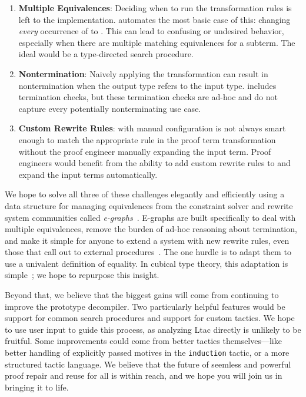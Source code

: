 \begin{enumerate}
\item \textbf{Multiple Equivalences}: Deciding when to run the transformation rules is left to the implementation.
\toolname automates the most basic case of this: changing \textit{every} occurrence of \A to \B.
This can lead to confusing or undesired behavior, especially when there are multiple matching equivalences for a subterm.
The ideal would be a type-directed search procedure.
\item \textbf{Nontermination}: Naively applying the transformation can result in nontermination when the output type refers to the input type.
\toolname includes termination checks, but these termination checks are ad-hoc and do not capture every potentially nonterminating use case.
\item \textbf{Custom Rewrite Rules}: \toolname with manual configuration is not always smart enough to match the appropriate rule in the proof term
transformation without the proof engineer manually expanding the input term.
Proof engineers would benefit from the ability to add custom rewrite rules to \toolname
and expand the input terms automatically.
\end{enumerate}
We hope to solve all three of these challenges elegantly and efficiently using a
data structure for managing equivalences from the constraint solver and rewrite system communities
called \textit{e-graphs}~\cite{egraph1}.
E-graphs are built specifically to deal with multiple equivalences,
remove the burden of ad-hoc reasoning about termination,
and make it simple for anyone to extend a system with new
rewrite rules, even those that call out
to external procedures~\cite{egraph5}.
The one hurdle is to adapt them to use a univalent definition of equality.
In cubical type theory, this adaptation is simple~\cite{egraph6}; we hope to repurpose this insight.

Beyond that, we believe that the biggest gains will come from continuing to improve the prototype decompiler.
Two particularly helpful features would be support for common search procedures and support for custom tactics.
We hope to use user input to guide this process, as analyzing Ltac directly is unlikely to be fruitful.
Some improvements could come from better tactics themselves---like better handling of explicitly passed 
motives in the \lstinline{induction} tactic, or a more structured tactic language.
We believe that the future of seemless and powerful proof repair and reuse for all is within reach,
and we hope you will join us in bringing it to life.



